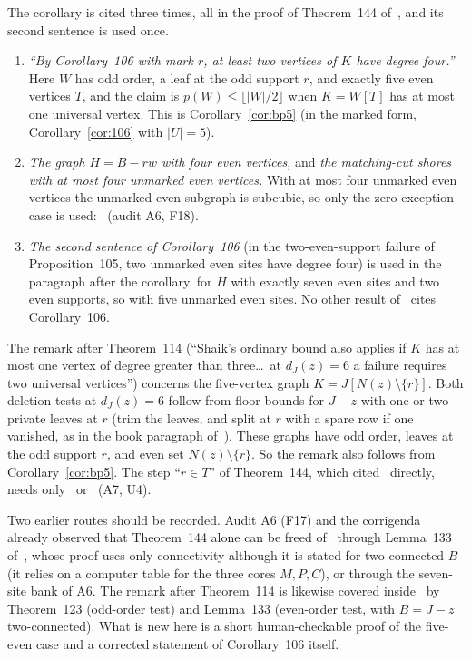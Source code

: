 \documentclass[11pt]{amsart}
\theoremstyle{definition}
\begin{document}
The corollary is cited three times, all in the proof of Theorem~144 of~\cite{MR}, and its second
sentence is used once.
\begin{enumerate}
\item \emph{``By Corollary~106 with mark $r$, at least two vertices of $K$ have degree four.''} Here
$W$ has odd order, a leaf at the odd support $r$, and exactly five even vertices $T$, and the claim
is $p(W)\le\lfloor|W|/2\rfloor$ when $K=W[T]$ has at most one universal vertex. This is
Corollary~\ref{cor:bp5} (in the marked form, Corollary~\ref{cor:106} with $|U|=5$).
\item \emph{The graph $H=B-rw$ with four even vertices,} and \emph{the matching-cut shores with at
most four unmarked even vertices.} With at most four unmarked even vertices the unmarked even
subgraph is subcubic, so only the zero-exception case is used:~\cite[Theorem~13]{BS} (audit A6, F18).
\item \emph{The second sentence of Corollary~106} (in the two-even-support failure of
Proposition~105, two unmarked even sites have degree four) is used in the paragraph after the
corollary, for $H$ with exactly seven even sites and two even supports, so with five unmarked even
sites. No other result of~\cite{MR} cites Corollary~106.
\end{enumerate}
The remark after Theorem~114 (``Shaik's ordinary bound also applies if $K$ has at most one vertex of
degree greater than three\ldots\ at $d_J(z)=6$ a failure requires two universal vertices'') concerns
the five-vertex graph $K=J[N(z)\setminus\{r\}]$. Both deletion tests at $d_J(z)=6$ follow from floor
bounds for $J-z$ with one or two private leaves at $r$ (trim the leaves, and split at $r$ with a
spare row if one vanished, as in the book paragraph of~\cite[\S19]{MR}). These graphs have odd
order, leaves at the odd support $r$, and even set $N(z)\setminus\{r\}$. So the remark also follows
from Corollary~\ref{cor:bp5}. The step ``$r\in T$'' of Theorem~144, which cited~\cite{Shaik}
directly, needs only~\cite[Theorem~13]{BS} or~\cite[Corollary~22]{ES} (A7, U4).

Two earlier routes should be recorded. Audit A6 (F17) and the corrigenda already observed that
Theorem~144 alone can be freed of~\cite{Shaik} through Lemma~133 of~\cite{MR}, whose proof uses only
connectivity although it is stated for two-connected $B$ (it relies on a computer table for the
three cores $M,P,C$), or through the seven-site bank of A6. The remark after Theorem~114 is likewise
covered inside~\cite{MR} by Theorem~123 (odd-order test) and Lemma~133 (even-order test, with
$B=J-z$ two-connected). What is new here is a short human-checkable proof of the five-even case and a
corrected statement of Corollary~106 itself.
\end{document}
